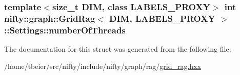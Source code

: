 \subsubsection[{number\+Of\+Threads}]{\setlength{\rightskip}{0pt plus 5cm}template$<$size\+\_\+t D\+I\+M, class L\+A\+B\+E\+L\+S\+\_\+\+P\+R\+O\+X\+Y$>$ int {\bf nifty\+::graph\+::\+Grid\+Rag}$<$ D\+I\+M, L\+A\+B\+E\+L\+S\+\_\+\+P\+R\+O\+X\+Y $>$\+::Settings\+::number\+Of\+Threads}\label{structnifty_1_1graph_1_1GridRag_1_1Settings_ac1e055fb552015ad19a2686e93e83436}


The documentation for this struct was generated from the following file\+:\begin{DoxyCompactItemize}
\item 
/home/tbeier/src/nifty/include/nifty/graph/rag/\hyperlink{grid__rag_8hxx}{grid\+\_\+rag.\+hxx}\end{DoxyCompactItemize}
